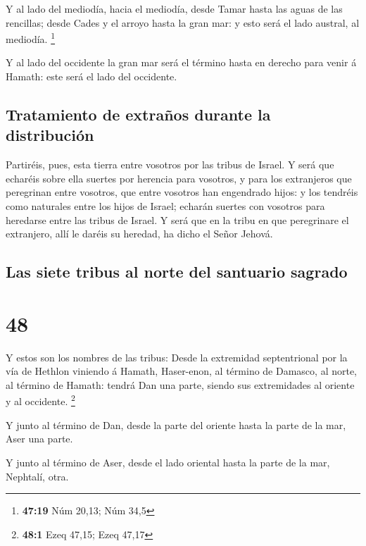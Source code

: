 Y al lado del mediodía, hacia el mediodía, desde Tamar
hasta las aguas de las rencillas; desde Cades y el arroyo hasta la gran
mar: y esto será el lado austral, al mediodía. \footnote{\textbf{47:19}
  Núm 20,13; Núm 34,5}

 Y al lado del occidente la gran mar será el término hasta
en derecho para venir á Hamath: este será el lado del occidente.

\hypertarget{tratamiento-de-extrauxf1os-durante-la-distribuciuxf3n}{%
\subsection{Tratamiento de extraños durante la
distribución}\label{tratamiento-de-extrauxf1os-durante-la-distribuciuxf3n}}

 Partiréis, pues, esta tierra entre vosotros por las tribus
de Israel.  Y será que echaréis sobre ella suertes por
herencia para vosotros, y para los extranjeros que peregrinan entre
vosotros, que entre vosotros han engendrado hijos: y los tendréis como
naturales entre los hijos de Israel; echarán suertes con vosotros para
heredarse entre las tribus de Israel.  Y será que en la
tribu en que peregrinare el extranjero, allí le daréis su heredad, ha
dicho el Señor Jehová.

\hypertarget{las-siete-tribus-al-norte-del-santuario-sagrado}{%
\subsection{Las siete tribus al norte del santuario
sagrado}\label{las-siete-tribus-al-norte-del-santuario-sagrado}}

\hypertarget{section-47}{%
\section{48}\label{section-47}}

 Y estos son los nombres de las tribus: Desde la extremidad
septentrional por la vía de Hethlon viniendo á Hamath, Haser-enon, al
término de Damasco, al norte, al término de Hamath: tendrá Dan una
parte, siendo sus extremidades al oriente y al occidente. \footnote{\textbf{48:1}
  Ezeq 47,15; Ezeq 47,17}

 Y junto al término de Dan, desde la parte del oriente hasta
la parte de la mar, Aser una parte.

 Y junto al término de Aser, desde el lado oriental hasta la
parte de la mar, Nephtalí, otra.


